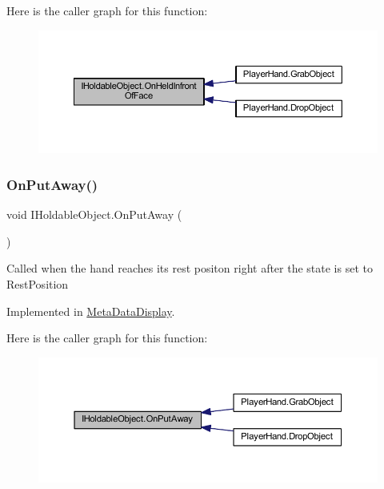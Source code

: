 Here is the caller graph for this function\+:\nopagebreak
\begin{figure}[H]
\begin{center}
\leavevmode
\includegraphics[width=350pt]{interface_i_holdable_object_a6f63fec8fb8f715ad5cdd08aa5ec0ea5_icgraph}
\end{center}
\end{figure}
\mbox{\label{interface_i_holdable_object_abe7c5e5ed97fb5c908c91da5b8714f0e}} 
\subsubsection{\texorpdfstring{On\+Put\+Away()}{OnPutAway()}}
{\footnotesize\ttfamily void I\+Holdable\+Object.\+On\+Put\+Away (\begin{DoxyParamCaption}{ }\end{DoxyParamCaption})}



Called when the hand reaches it\textquotesingle{}s rest positon right after the state is set to Rest\+Position 



Implemented in \mbox{\hyperlink{class_meta_data_display_a55888c6c3e3e224d89d95b6c63652762}{Meta\+Data\+Display}}.

Here is the caller graph for this function\+:\nopagebreak
\begin{figure}[H]
\begin{center}
\leavevmode
\includegraphics[width=350pt]{interface_i_holdable_object_abe7c5e5ed97fb5c908c91da5b8714f0e_icgraph}
\end{center}
\end{figure}
\mbox{\label{interface_i_holdable_object_a75f802a9736db51e5e8d1568689dd11c}} 
